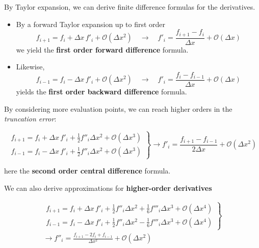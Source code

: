 By Taylor expansion, we can derive finite difference formulas for the derivatives.

\begin{itemize}
    \item By a forward Taylor expansion up to first order
            \begin{equation}
                f_{i+1} = f_{i} + \Delta x \, f'_i + \mathcal{O}(\Delta x^2) \quad \rightarrow \quad f'_i = \frac{f_{i+1} - f_{i}}{\Delta x} + \mathcal{O}(\Delta x)
            \end{equation}
          we yield the \textbf{first order forward difference} formula.
    \item Likewise,
        \begin{equation}
            f_{i-1} = f_{i} - \Delta x \, f'_i + \mathcal{O}(\Delta x^2) \quad \rightarrow \quad f'_i = \frac{f_{i} - f_{i-1}}{\Delta x} + \mathcal{O}(\Delta x)
        \end{equation}
          yields the \textbf{first order backward difference} formula.
\end{itemize}

By considering more evaluation points, we can reach higher orders in the \textit{truncation error}:

\begin{equation}
    \left. \begin{matrix}
        f_{i+1} = f_{i} + \Delta x \, f'_i + \frac{1}{2} f''_i \Delta x^2 + \mathcal{O}(\Delta x^3) \\
        f_{i-1} = f_{i} - \Delta x \, f'_i + \frac{1}{2} f''_i \Delta x^2 + \mathcal{O}(\Delta x^3)
    \end{matrix} \right\} \rightarrow f'_i = \frac{f_{i+1} - f_{i-1}}{2 \Delta x} + \mathcal{O}(\Delta x^2)
\end{equation}

here the \textbf{second order central difference} formula.

We can also derive approximations for \textbf{higher-order derivatives}

\begin{equation}
    \begin{gathered}
        \left. \begin{matrix}
            f_{i+1} = f_{i} + \Delta x \, f'_i + \frac{1}{2} f''_i \Delta x^2 + \frac{1}{6} f'''_i \Delta x^3 + \mathcal{O}(\Delta x^4) \\
            f_{i-1} = f_{i} - \Delta x \, f'_i + \frac{1}{2} f''_i \Delta x^2 - \frac{1}{6} f'''_i \Delta x^3 + \mathcal{O}(\Delta x^4)
        \end{matrix} \right\} \\
        \rightarrow f''_i = \frac{f_{i+1} - 2 f_{i}  + f_{i-1}}{\Delta x^2} + \mathcal{O}(\Delta x^2)
    \end{gathered}
\end{equation}

